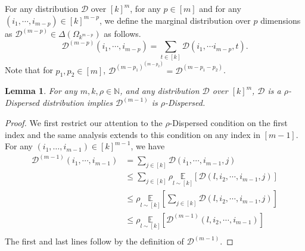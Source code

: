 \documentclass[10pt,a4paper]{article}
\newtheorem{lemma}[theorem]{Lemma}
\newcommand{\sD}{\mathcal{D}}
\begin{document}
For any distribution $\sD$ over $[k]^{m}$, for any $p\in [m]$ and for any $(i_{1},\cdots,i_{m-p})\in [k]^{m-p}$, we define the marginal distribution over $p$ dimensions as  $\mathcal{D}^{(m-p)}\in \Delta(\Omega_{k^{m-p}})$ as follows.
\begin{equation*}
    \sD^{(m-p)}(i_{1},\cdots, i_{m-p})=\sum_{t\in [k]}\sD(i_{1},\cdots i_{m-p},t).
\end{equation*}
\noindent Note that for $p_{1},p_{2}\in [m]$, $\sD^{(m-p_{1})^{(m-p_{2})}}=\sD^{(m-p_{1}-p_{2})}$.

\begin{lemma}\label{lem:fold_dispersed}
    For any $m,k,\rho\in \mathbb{N}$, and any distribution $\sD$ over $[k]^{m}$, $\sD$ is a $\rho$-Dispersed distribution implies $\sD^{(m-1)}$ is $\rho$-Dispersed.
\end{lemma}

\begin{proof}
    We first restrict our attention to the $\rho$-Dispersed condition on the first index and the same analysis extends to this condition on any index in $[m-1]$. For any $(i_1, \dots, i_{m-1}) \in [k]^{m-1}$, we have
    \[
    \begin{split}
        \sD^{(m-1)}(i_{1},\cdots, i_{m-1})&=\sum_{j\in [k]}\sD(i_{1},\cdots, i_{m-1},j)\\
        &\leq \sum_{j\in [k]}\rho\underset{{l\sim [k]}}{\mathbb{E}}[\sD(l,i_{2},\cdots, i_{m-1}, j)]\\
        &\leq \rho\underset{{l\sim [k]}}{\mathbb{E}}\left[\sum_{j\in [k]}\sD(l,i_{2},\cdots, i_{m-1}, j)\right]\\
        & \leq\rho \underset{{l\sim [k]}}{\mathbb{E}}[\sD^{(m-1)}(l,i_{2},\cdots, i_{m-1})]\\
    \end{split}
    \]
    The first and last lines follow by the definition of $\sD^{(m-1)}$. 
\end{proof}
\end{document}
